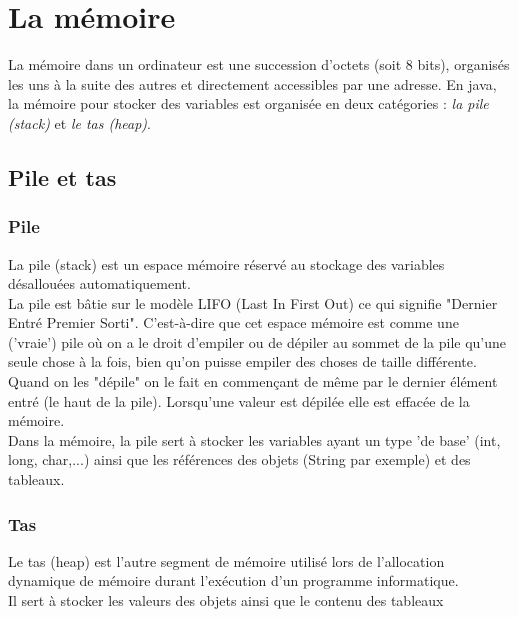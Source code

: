 \documentclass[a4paper,10pt]{book} %
\begin{document}


\chapter{La mémoire}
La mémoire dans un ordinateur est une succession d’octets (soit 8 bits), organisés les uns à la suite des autres et directement accessibles par une adresse.
En java, la mémoire pour stocker des variables est organisée en deux catégories : \textit{la pile (stack)} et \textit{le tas (heap)}.

\section{Pile et tas}
\subsection{Pile}
La pile (stack) est un espace mémoire réservé au stockage des variables désallouées automatiquement.\\

La pile est bâtie sur le modèle LIFO (Last In First Out) ce qui signifie "Dernier Entré Premier Sorti". C'est-à-dire que cet espace mémoire est comme une ('vraie') pile où on a le droit d’empiler ou de dépiler au sommet de la pile qu’une seule chose à la fois, bien qu'on puisse empiler des choses de taille différente.\\

Quand on les "dépile" on le fait en commençant de même par le dernier élément entré (le haut de la pile). Lorsqu’une valeur est dépilée elle est effacée de la mémoire.\\

Dans la mémoire, la pile sert à stocker les variables ayant un type 'de base' (int, long, char,...) ainsi que les références des objets (String par exemple) et des tableaux.

\subsection{Tas}
Le tas (heap) est l’autre segment de mémoire utilisé lors de l’allocation dynamique de mémoire durant l’exécution d’un programme informatique.\\

Il sert à stocker les valeurs des objets ainsi que le contenu des tableaux
\end{document}
